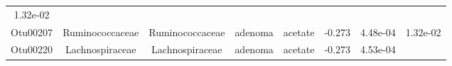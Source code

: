 \documentclass[11pt,]{article}
\begin{document}
\begin{longtable}[]{@{}cccccccc@{}}
\begin{minipage}[t]{0.08\columnwidth}
1.32e-02\strut
\end{minipage}\tabularnewline
\begin{minipage}[t]{0.08\columnwidth}\centering\strut
Otu00207\strut
\end{minipage} & \begin{minipage}[t]{0.15\columnwidth}\centering\strut
Ruminococcaceae\strut
\end{minipage} & \begin{minipage}[t]{0.15\columnwidth}\centering\strut
Ruminococcaceae\strut
\end{minipage} & \begin{minipage}[t]{0.08\columnwidth}\centering\strut
adenoma\strut
\end{minipage} & \begin{minipage}[t]{0.09\columnwidth}\centering\strut
acetate\strut
\end{minipage} & \begin{minipage}[t]{0.07\columnwidth}\centering\strut
-0.273\strut
\end{minipage} & \begin{minipage}[t]{0.08\columnwidth}\centering\strut
4.48e-04\strut
\end{minipage} & \begin{minipage}[t]{0.08\columnwidth}\centering\strut
1.32e-02\strut
\end{minipage}\tabularnewline
\begin{minipage}[t]{0.08\columnwidth}\centering\strut
Otu00220\strut
\end{minipage} & \begin{minipage}[t]{0.15\columnwidth}\centering\strut
Lachnospiraceae\strut
\end{minipage} & \begin{minipage}[t]{0.15\columnwidth}\centering\strut
Lachnospiraceae\strut
\end{minipage} & \begin{minipage}[t]{0.08\columnwidth}\centering\strut
adenoma\strut
\end{minipage} & \begin{minipage}[t]{0.09\columnwidth}\centering\strut
acetate\strut
\end{minipage} & \begin{minipage}[t]{0.07\columnwidth}\centering\strut
-0.273\strut
\end{minipage} & \begin{minipage}[t]{0.08\columnwidth}\centering\strut
4.53e-04\strut
\end{minipage} & \begin{minipage}[t]{0.08\columnwidth}\centering\strut

\end{minipage}
\end{longtable}
\end{document}
